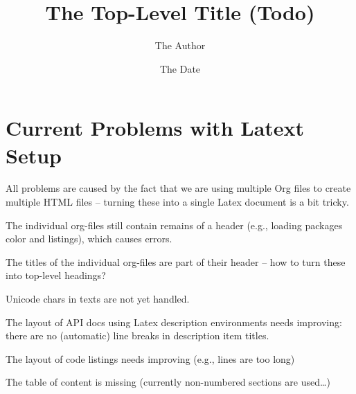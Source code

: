 \documentclass[11pt]{article}
\author{The Author}
\date{The Date}
\title{The Top-Level Title (Todo)}
\begin{document}
\maketitle

\section*{Current Problems with Latext Setup}
\label{sec:curr-probl-with}

All problems are caused by the fact that we are using multiple Org files to create multiple HTML files -- turning these into a single Latex document is a bit tricky.

The individual org-files still contain remains of a header (e.g., loading packages color and listings), which causes errors.

The titles of the individual org-files are part of their header -- how to turn these into top-level headings?

Unicode chars in texts are not yet handled.

The layout of API docs using Latex description environments needs improving: there are no (automatic) line breaks in description item titles.

The layout of code listings needs improving (e.g., lines are too long)

The table of content is missing (currently non-numbered sections are used\dots)





\end{document}
